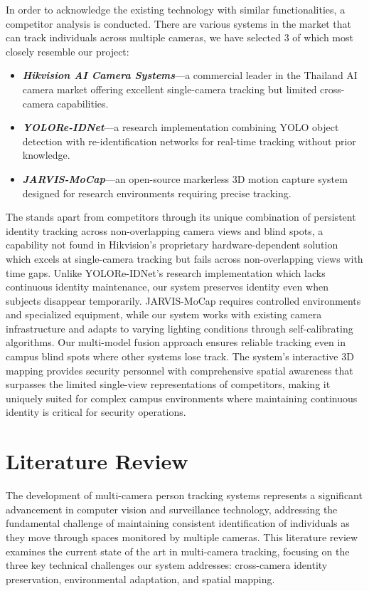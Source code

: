 In order to acknowledge the existing technology with similar functionalities, a competitor analysis is conducted.
There are various systems in the market that can track individuals across multiple cameras, we have selected 3 of which most closely resemble our project:

\begin{itemize}
   \item \textbf{\textit{Hikvision AI Camera Systems}}---a commercial leader in the Thailand AI camera market offering excellent single-camera tracking but limited cross-camera capabilities.
   \item \textbf{\textit{YOLORe-IDNet}}---a research implementation combining YOLO object detection with re-identification networks for real-time tracking without prior knowledge.
   \item \textbf{\textit{JARVIS-MoCap}}---an open-source markerless 3D motion capture system designed for research environments requiring precise tracking.
\end{itemize}
\par
The \usevar{\srsTitle} stands apart from competitors through its unique combination of persistent identity tracking across non-overlapping camera views and blind spots, a capability not found in Hikvision's proprietary hardware-dependent solution which excels at single-camera tracking but fails across non-overlapping views with time gaps. Unlike YOLORe-IDNet's research implementation which lacks continuous identity maintenance, our system preserves identity even when subjects disappear temporarily. JARVIS-MoCap requires controlled environments and specialized equipment, while our system works with existing camera infrastructure and adapts to varying lighting conditions through self-calibrating algorithms. Our multi-model fusion approach ensures reliable tracking even in campus blind spots where other systems lose track. The system's interactive 3D mapping provides security personnel with comprehensive spatial awareness that surpasses the limited single-view representations of competitors, making it uniquely suited for complex campus environments where maintaining continuous identity is critical for security operations.

\section{Literature Review}
\label{section:literature-review}

The development of multi-camera person tracking systems represents a significant advancement in computer vision and surveillance technology, addressing the fundamental challenge of maintaining consistent identification of individuals as they move through spaces monitored by multiple cameras. This literature review examines the current state of the art in multi-camera tracking, focusing on the three key technical challenges our system addresses: cross-camera identity preservation, environmental adaptation, and spatial mapping.


